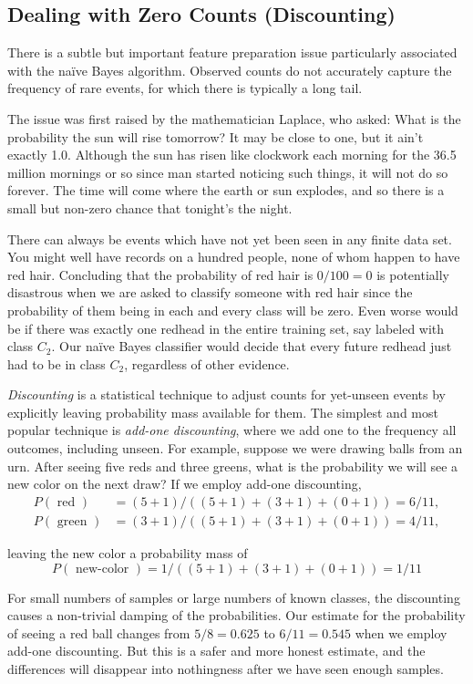 \documentclass[10pt]{article}
\begin{document}
\begin{enumerate}
\subsection*{Dealing with Zero Counts (Discounting)}
There is a subtle but important feature preparation issue particularly associated with the naïve Bayes algorithm. Observed counts do not accurately capture the frequency of rare events, for which there is typically a long tail.

The issue was first raised by the mathematician Laplace, who asked: What is the probability the sun will rise tomorrow? It may be close to one, but it ain't exactly 1.0. Although the sun has risen like clockwork each morning for the 36.5 million mornings or so since man started noticing such things, it will not do so forever. The time will come where the earth or sun explodes, and so there is a small but non-zero chance that tonight's the night.

There can always be events which have not yet been seen in any finite data set. You might well have records on a hundred people, none of whom happen to have red hair. Concluding that the probability of red hair is $0 / 100=0$ is potentially disastrous when we are asked to classify someone with red hair since the probability of them being in each and every class will be zero. Even worse would be if there was exactly one redhead in the entire training set, say labeled with class $C_2$. Our naïve Bayes classifier would decide that every future redhead just had to be in class $C_2$, regardless of other evidence.

\textit{Discounting} is a statistical technique to adjust counts for yet-unseen events by explicitly leaving probability mass available for them. The simplest and most popular technique is \textit{add-one discounting}, where we add one to the frequency all outcomes, including unseen. For example, suppose we were drawing balls from an urn. After seeing five reds and three greens, what is the probability we will see a new color on the next draw? If we employ add-one discounting,
\[
\begin{aligned}
P(\text { red })&=(5+1) /((5+1)+(3+1)+(0+1))=6 / 11,\\
P(\text { green })&=(3+1) /((5+1)+(3+1)+(0+1))=4 / 11,
\end{aligned}
\]

leaving the new color a probability mass of
\[
P(\text { new-color })=1 /((5+1)+(3+1)+(0+1))=1 / 11
\]

For small numbers of samples or large numbers of known classes, the discounting causes a non-trivial damping of the probabilities. Our estimate for the probability of seeing a red ball changes from $5 / 8=0.625$ to $6 / 11=0.545$ when we employ add-one discounting. But this is a safer and more honest estimate, and the differences will disappear into nothingness after we have seen enough samples.


\end{enumerate}
\end{document}
